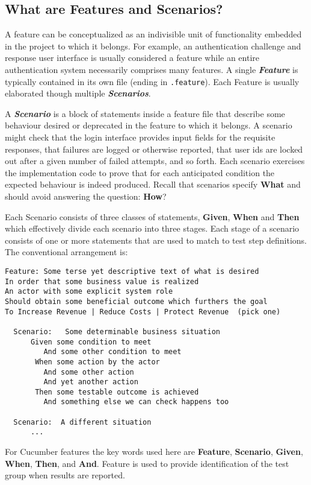 \subsection{What are Features and Scenarios?}

A feature can be conceptualized as an indivisible unit of functionality embedded in the project to which it belongs.  For example, an authentication challenge and response user interface is usually considered a feature while an entire authentication system necessarily comprises many features.   A single \textbf{\emph{Feature}} is typically contained in its own file (ending in \verb+.feature+).  Each Feature is usually elaborated though multiple \textbf{\emph{Scenarios}}.

A \textbf{\emph{Scenario}} is a block of statements inside a feature file that describe some behaviour desired or deprecated in the feature to which it belongs.  A scenario might check that the login interface provides input fields for the requisite responses, that failures are logged or otherwise reported, that user ids are locked out after a given number of failed attempts, and so forth.  Each scenario exercises the implementation code to prove that for each anticipated condition the expected behaviour is indeed produced.  Recall that scenarios specify \textbf{What} and should avoid answering the question: \textbf{How}?

Each Scenario consists of three classes of statements, \textbf{Given}, \textbf{When} and \textbf{Then} which effectively divide each scenario into three stages.  Each stage of a scenario consists of one or more statements that are used to match to test step definitions. The conventional arrangement is:

\begin{verbatim}
Feature: Some terse yet descriptive text of what is desired
In order that some business value is realized
An actor with some explicit system role
Should obtain some beneficial outcome which furthers the goal
To Increase Revenue | Reduce Costs | Protect Revenue  (pick one)

  Scenario:   Some determinable business situation
      Given some condition to meet
         And some other condition to meet
       When some action by the actor
         And some other action
         And yet another action
       Then some testable outcome is achieved
         And something else we can check happens too

  Scenario:  A different situation
      ...

\end{verbatim}
For Cucumber features the key words used here are \textbf{Feature}, \textbf{Scenario}, \textbf{Given}, \textbf{When}, \textbf{Then}, and \textbf{And}.  Feature is used to provide identification of the test group when results are reported.

